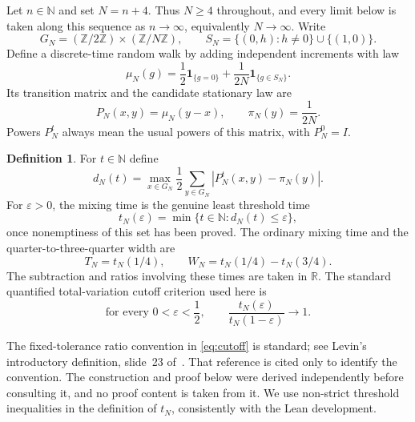 \documentclass[11pt,a4paper]{article}
\theoremstyle{definition}
\newtheorem{definition}[theorem]{Definition}
\theoremstyle{remark}
\newcommand{\R}{\mathbb R}
\newcommand{\N}{\mathbb N}
\newcommand{\Z}{\mathbb Z}
\newcommand{\ind}{\mathbf 1}
\begin{document}
Let $n\in\N$ and set $N=n+4$. Thus $N\ge4$ throughout, and every limit below
is taken along this sequence as $n\to\infty$, equivalently $N\to\infty$.
Write
\[
G_N=(\Z/2\Z)\times(\Z/N\Z),\qquad
S_N=\{(0,h):h\ne0\}\cup\{(1,0)\}.
\]
Define a discrete-time random walk by adding independent increments with law
\begin{equation}\label{eq:jump}
\mu_N(g)=\frac12\ind_{\{g=0\}}
        +\frac1{2N}\ind_{\{g\in S_N\}}.
\end{equation}
Its transition matrix and the candidate stationary law are
\begin{equation}\label{eq:kernel}
P_N(x,y)=\mu_N(y-x),\qquad \pi_N(y)=\frac1{2N}.
\end{equation}
Powers $P_N^t$ always mean the usual powers of this matrix, with $P_N^0=I$.

\begin{definition}\label{def:mixing}
For $t\in\N$ define
\[
d_N(t)=\max_{x\in G_N}\frac12\sum_{y\in G_N}
          \left|P_N^t(x,y)-\pi_N(y)\right|.
\]
For $\varepsilon>0$, the mixing time is the genuine least threshold time
\[
t_N(\varepsilon)=\min\{t\in\N:d_N(t)\le\varepsilon\},
\]
once nonemptiness of this set has been proved. The ordinary mixing time and
the quarter-to-three-quarter width are
\[
T_N=t_N(1/4),\qquad W_N=t_N(1/4)-t_N(3/4).
\]
The subtraction and ratios involving these times are taken in $\R$.
The standard quantified total-variation cutoff criterion used here is
\begin{equation}\label{eq:cutoff}
\text{for every }0<\varepsilon<\frac12,\qquad
\frac{t_N(\varepsilon)}{t_N(1-\varepsilon)}\longrightarrow1.
\end{equation}
\end{definition}

The fixed-tolerance ratio convention in \eqref{eq:cutoff} is standard; see
Levin's introductory definition, slide~23 of~\cite{levin}. That reference is
cited only to identify the convention. The construction and proof below
were derived independently before consulting it, and no proof content is
taken from it. We use non-strict threshold inequalities in the definition
of $t_N$, consistently with the Lean development.
\end{document}
